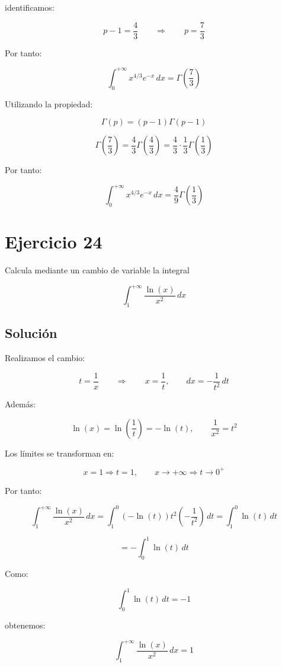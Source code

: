 \documentclass[fleqn]{article}
\begin{document}
	identificamos:

	\[
	p-1=\frac{4}{3}
	\qquad\Longrightarrow\qquad
	p=\frac{7}{3}
	\]

	Por tanto:

	\[
	\int_0^{+\infty}x^{4/3}e^{-x}\,dx
	=
	\Gamma\left(\frac{7}{3}\right)
	\]

	Utilizando la propiedad:

	\[
	\Gamma(p)
	=
	(p-1)\Gamma(p-1)
	\]

	\[
	\Gamma\left(\frac{7}{3}\right)
	=
	\frac{4}{3}
	\Gamma\left(\frac{4}{3}\right)
	=
	\frac{4}{3}\cdot\frac{1}{3}
	\Gamma\left(\frac{1}{3}\right)
	\]

	Por tanto:

	\[
	\boxed{
	\int_0^{+\infty}x^{4/3}e^{-x}\,dx
	=
	\frac{4}{9}
	\Gamma\left(\frac{1}{3}\right)
	}
	\]

\section{Ejercicio 24}
	Calcula mediante un cambio de variable la integral

	\[
	\int_1^{+\infty}\frac{\ln(x)}{x^2}\,dx
	\]

	\subsection{Solución}

	Realizamos el cambio:

	\[
	t=\frac{1}{x}
	\qquad\Longrightarrow\qquad
	x=\frac{1}{t},
	\qquad
	dx=-\frac{1}{t^2}\,dt
	\]

	Además:

	\[
	\ln(x)=\ln\left(\frac{1}{t}\right)=-\ln(t),
	\qquad
	\frac{1}{x^2}=t^2
	\]

	Los límites se transforman en:

	\[
	x=1\Longrightarrow t=1,
	\qquad
	x\to+\infty\Longrightarrow t\to0^+
	\]

	Por tanto:

	\[
	\int_1^{+\infty}\frac{\ln(x)}{x^2}\,dx
	=
	\int_1^0
	(-\ln(t))t^2
	\left(-\frac{1}{t^2}\right)\,dt
	=
	\int_1^0\ln(t)\,dt
	\]

	\[
	=
	-\int_0^1\ln(t)\,dt
	\]

	Como:

	\[
	\int_0^1\ln(t)\,dt=-1
	\]

	obtenemos:

	\[
	\boxed{
	\int_1^{+\infty}\frac{\ln(x)}{x^2}\,dx=1
	}
	\]
\end{document}
